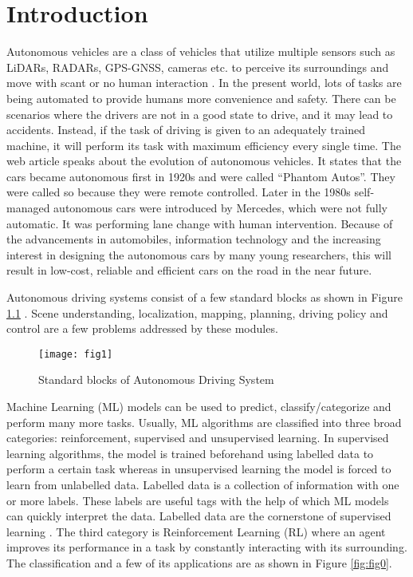 
\chapter{Introduction}
\label{ch:INTR}
Autonomous vehicles are a class of vehicles that utilize multiple sensors such as LiDARs, RADARs, GPS-GNSS, cameras etc. to perceive its surroundings and move with scant or no human interaction \cite{kiran2021deep}. In the present world, lots of tasks are being automated to provide humans more convenience and safety. There can be scenarios where the drivers are not in a good state to drive, and it may lead to accidents. Instead, if the task of driving is given to an adequately trained machine, it will perform its task with maximum efficiency every single time. The web article \cite{grannyDLS} speaks about the evolution of autonomous vehicles. It states that the cars became autonomous first in 1920s and were called “Phantom Autos”. They were called so because they were remote controlled. Later in the 1980s self-managed autonomous cars were introduced by Mercedes, which were not fully automatic. It was performing lane change with human intervention. Because of the advancements in automobiles, information technology and the increasing interest in designing the autonomous cars by many young researchers, this will result in low-cost, reliable and efficient cars on the road in the near future.


\par
Autonomous driving systems consist of a few standard blocks as shown in Figure \ref{fig:fig1} \cite{kiran2021deep}. Scene understanding, localization, mapping, planning, driving policy and control are a few problems addressed by these modules. 

\begin{figure}[h]
	\centering
	\texttt{[image: fig1]}
	\caption{Standard blocks of Autonomous Driving System \cite{kiran2021deep} }
	\label{fig:fig1}
\end{figure}


\par
Machine Learning (ML) models can be used to predict, classify/categorize and perform many more tasks. Usually, ML algorithms are classified into three broad categories: reinforcement, supervised and unsupervised learning. In supervised learning algorithms, the model is trained beforehand using labelled data to perform a certain task whereas in unsupervised learning the model is forced to learn from unlabelled data. Labelled data is a collection of information with one or more labels. These labels are useful tags with the help of which ML models can quickly interpret the data. Labelled data are the cornerstone of supervised learning \cite{fredriksson2020data}. The third category is Reinforcement Learning (RL) where an agent improves its performance in a task by constantly interacting with its surrounding. The classification and a few of its applications are as shown in Figure \ref{fig:fig0}. 

